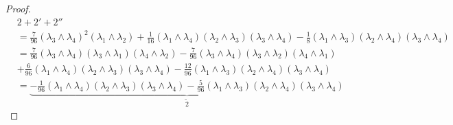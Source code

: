\documentclass[11pt]{amsart}
\theoremstyle{definition}
\theoremstyle{remark}
\numberwithin{equation}{section}
\begin{document}
\begin{proof}
\begin{align*}
&\boxed{2}+\boxed{2'}+\boxed{2''}\\
   & =\frac{7}{96}\left(\lambda_3 \wedge \lambda_4\right)^2\left(\lambda_1 \wedge \lambda_2\right) +\frac{1}{16}\left(\lambda_1 \wedge \lambda_4\right)\left(\lambda_2 \wedge \lambda_3\right)\left(\lambda_3 \wedge \lambda_4\right) -\frac{1}{8}\left(\lambda_1 \wedge \lambda_3\right)\left(\lambda_2 \wedge \lambda_4\right)\left(\lambda_3 \wedge \lambda_4\right)\\
   & = \frac{7}{96}\left(\lambda_3 \wedge \lambda_4\right)\left(\lambda_3 \wedge \lambda_1\right)\left(\lambda_4 \wedge \lambda_2\right)- \frac{7}{96}\left(\lambda_3 \wedge \lambda_4\right)\left(\lambda_3 \wedge \lambda_2\right)\left(\lambda_4 \wedge \lambda_1\right)\\
    &+\frac{6}{96}\left(\lambda_1 \wedge \lambda_4\right)\left(\lambda_2 \wedge \lambda_3\right)\left(\lambda_3 \wedge \lambda_4\right) -\frac{12}{96}\left(\lambda_1 \wedge \lambda_3\right)\left(\lambda_2 \wedge \lambda_4\right)\left(\lambda_3 \wedge \lambda_4\right)\\
    &=\underbrace{-\frac{1}{96}\left(\lambda_1 \wedge \lambda_4\right)\left(\lambda_2 \wedge \lambda_3\right)\left(\lambda_3 \wedge \lambda_4\right) -\frac{5}{96}\left(\lambda_1 \wedge \lambda_3\right)\left(\lambda_2 \wedge \lambda_4\right)\left(\lambda_3 \wedge \lambda_4\right)}_{\boxed{\tilde{2}}}
\end{align*}


\end{proof}
\end{document}
